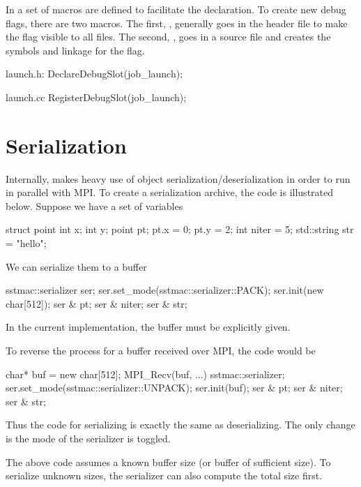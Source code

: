 In  a set of macros are defined to facilitate the declaration.
To create new debug flags, there are two macros.
The first, , generally goes in the header file to make the flag visible to all files.
The second, , goes in a source file and creates the symbols and linkage for the flag.

\begin{CppCode}
launch.h:
DeclareDebugSlot(job_launch);

launch.cc
RegisterDebugSlot(job_launch);
\end{CppCode}

\section{Serialization}\label{sec:serialize}
Internally, \sstmacro makes heavy use of object serialization/deserialization in order to run in parallel with MPI.
To create a serialization archive, the code is illustrated below. Suppose we have a set of variables

\begin{CppCode}
struct point {
 int x;
 int y;
}
point pt;
pt.x = 0;
pt.y = 2;
int niter = 5;
std::string str = "hello";
\end{CppCode}

We can serialize them to a buffer

\begin{CppCode}
sstmac::serializer ser;
ser.set_mode(sstmac::serializer::PACK);
ser.init(new char[512]);
ser & pt;
ser & niter;
ser & str;
\end{CppCode}
In the current implementation, the buffer must be explicitly given.

To reverse the process for a buffer received over MPI, the code would be

\begin{CppCode}
char* buf = new char[512];
MPI_Recv(buf, ...)
sstmac::serializer;
ser.set_mode(sstmac::serializer::UNPACK);
ser.init(buf);
ser & pt;
ser & niter;
ser & str;
\end{CppCode}

Thus the code for serializing is exactly the same as deserializing. The only change is the mode of the serializer is toggled.

The above code assumes a known buffer size (or buffer of sufficient size).
To serialize unknown sizes, the serializer can also compute the total size first.

